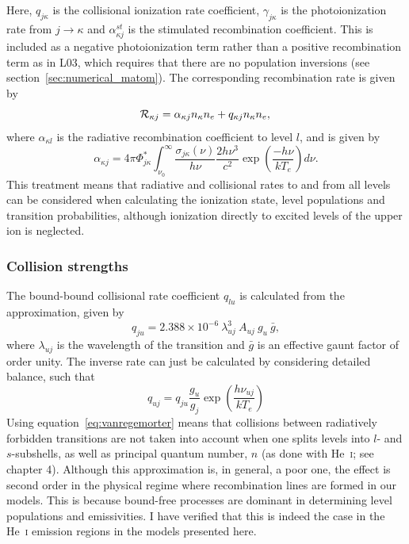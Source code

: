 Here, $q_{j \kappa}$ is the collisional ionization rate coefficient, 
$\gamma_{j \kappa}$ is the photoionization rate
from $j \rightarrow \kappa$ and $\alpha^{st}_{\kappa j}$ is the stimulated recombination
coefficient. This is included as a negative photoionization term rather 
than a positive recombination term as in L03, which requires that there are
no population inversions (see section~\ref{sec:numerical_matom}). 
The corresponding recombination rate is given by 
\begin{equation}
{\cal R}_{\kappa j} = \alpha_{\kappa j} n_{\kappa} n_e + q_{\kappa j}
n_\kappa n_e, \\
\end{equation}
where $\alpha_{\kappa l}$ is the radiative recombination coefficient
to level $l$, and is given by 
\begin{equation}
\alpha_{\kappa j} = 4\pi \Phi^*_{j\kappa} \int^\infty_{\nu_0} 
\frac{\sigma_{j\kappa} (\nu)}{h \nu} \frac{2 h \nu^3}{c^2} 
\exp \left( \frac{- h \nu}{k T_e} \right) d\nu.
\label{eq:alpha_sp}
\end{equation}
This treatment means that radiative and collisional
rates to and from all levels can be considered when calculating the
ionization state, level populations and transition probabilities, 
although ionization directly to excited levels of the upper ion is 
neglected. 

\subsubsection{Collision strengths}
\label{sec:coll}

The bound-bound collisional rate coefficient $q_{lu}$ is calculated from the
\cite{vanregemorter} approximation, given by
\begin{equation}
q_{ju} = 2.388 \times 10^{-6}~\lambda_{uj}^3~A_{uj}~g_u~\bar{g},
\label{eq:vanregemorter}
\end{equation}
where $\lambda_{uj}$ is the wavelength of the transition and $\bar{g}$ is 
an effective gaunt factor of order unity.
The inverse rate can just be calculated by considering detailed balance, 
such that
\begin{equation}
q_{uj} = q_{ju} \frac{g_u}{g_j} \exp \left( \frac{h \nu_{uj}}{k T_e} \right)
\label{eq:vanregemorter2}
\end{equation}
Using equation~\ref{eq:vanregemorter} means that collisions between radiatively
forbidden transitions are not taken into account when one 
splits levels into $l$- and $s$-subshells, as well
as principal quantum number, $n$ (as done with He~\textsc{i}; 
see chapter 4). Although this approximation is, in general, 
a poor one, the effect is second order in the physical 
regime where recombination lines are formed in our models. 
This is because bound-free processes are dominant in determining 
level populations and emissivities. I have verified that this 
is indeed the case in the He~\textsc{i} emission regions in the models
presented here.

